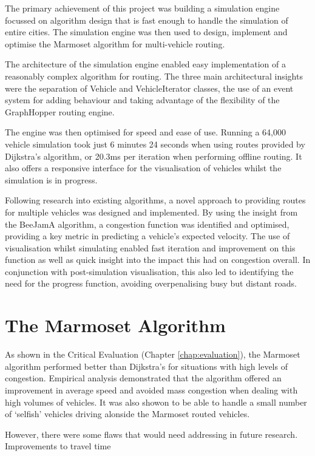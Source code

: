 \documentclass[ %
                    author={Alexander Hill},
                supervisor={Dr. Benjamin Sach},
                    degree={MEng},
                     title={MARMOSET},
                  subtitle={Multi-Agent Route Management using Online Simulation for Efficient Transportation},
                      type={research},
                      year={2016} ]{dissertation}
\begin{document}
The primary achievement of this project was building a simulation engine focussed
on algorithm design that is fast enough to handle the simulation of entire cities.
The simulation engine was then used to design, implement and optimise the
Marmoset algorithm for multi-vehicle routing.

The architecture of the simulation engine enabled easy implementation of a
reasonably complex algorithm for routing. The three main architectural insights
were the separation of Vehicle and VehicleIterator classes, the use of an event
system for adding behaviour and taking advantage of the flexibility of the
GraphHopper routing engine.

The engine was then optimised for speed and ease of use. Running a 64,000
vehicle simulation took just 6 minutes 24 seconds when using routes provided by
Dijkstra's algorithm, or 20.3ms per iteration when performing offline routing.
It also offers a responsive interface for the visualisation of vehicles whilst
the simulation is in progress.

Following research into existing algorithms, a novel approach to providing
routes for multiple vehicles was designed and implemented. By using the insight
from the BeeJamA algorithm, a congestion function was identified and optimised,
providing a key metric in predicting a vehicle's expected velocity. The use of
visualisation whilst simulating enabled fast iteration and improvement on this
function as well as quick insight into the impact this had on congestion
overall. In conjunction with post-simulation visualisation, this also led to
identifying the need for the progress function, avoiding overpenalising busy but
distant roads.

\section{The Marmoset Algorithm}

As shown in the Critical Evaluation (Chapter \ref{chap:evaluation}), the
Marmoset algorithm performed better than Dijkstra's for situations with high
levels of congestion. Empirical analysis demonstrated that the algorithm offered
an improvement in average speed and avoided mass congestion when dealing with
high volumes of vehicles. It was also showon to be able to handle a small number
of `selfish' vehicles driving alonside the Marmoset routed vehicles.

However, there were some flaws that would need addressing in future research.
Improvements to travel time
\end{document}
